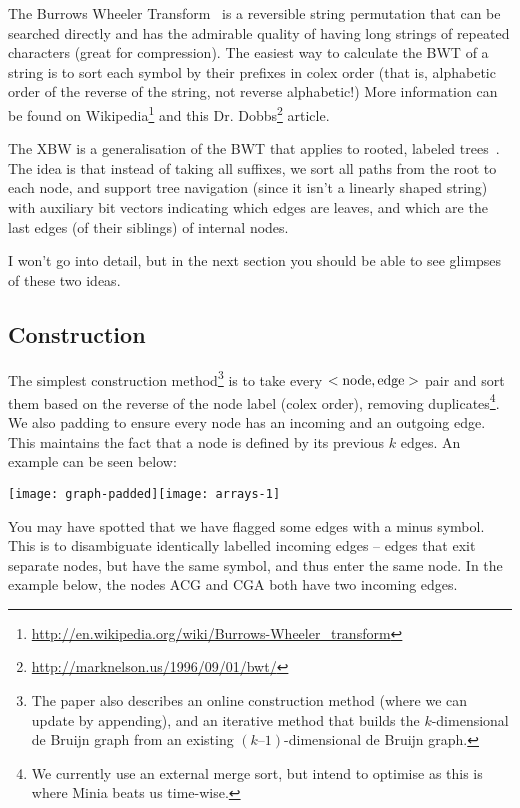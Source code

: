 The Burrows Wheeler Transform~\cite{BurWhe94} is a reversible string permutation that can be searched directly and has the admirable quality of having long strings of repeated characters (great for compression). The easiest way to calculate the BWT of a string is to sort each symbol by their prefixes in colex order (that is, alphabetic order of the reverse of the string, not reverse alphabetic!) More information can be found on Wikipedia\footnote{\url{http://en.wikipedia.org/wiki/Burrows-Wheeler_transform}} and this Dr. Dobbs\footnote{\url{http://marknelson.us/1996/09/01/bwt/}} article.

The XBW is a generalisation of the BWT that applies to rooted, labeled trees~\cite{FLMM09}. The idea is that instead of taking all suffixes, we sort all paths from the root to each node, and support tree navigation (since it isn't a linearly shaped string) with auxiliary bit vectors indicating which edges are leaves, and which are the last edges (of their siblings) of internal nodes.

I won't go into detail, but in the next section you should be able to see glimpses of these two ideas.

\subsection{Construction}\label{bl-sec:con}

The simplest construction method\footnote{The paper also describes an online construction method (where we can update by appending), and an iterative method that builds the $k$-dimensional de Bruijn graph from an existing $(k–1)$-dimensional de Bruijn graph.} is to take every $<\rm node, edge>$ pair and sort them based on the reverse of the node label (colex order), removing duplicates\footnote{We currently use an external merge sort, but intend to optimise as this is where Minia beats us time-wise.}. We also padding to ensure every node has an incoming and an outgoing edge. This maintains the fact that a node is defined by its previous $k$ edges. An example can be seen below:

\medskip\centerline{\texttt{[image: graph-padded]}\hfill\texttt{[image: arrays-1]}}\medskip
 
You may have spotted that we have flagged some edges with a minus symbol. This is to disambiguate identically labelled incoming edges -- edges that exit separate nodes, but have the same symbol, and thus enter the same node. In the example below, the nodes ACG and CGA both have two incoming edges.

